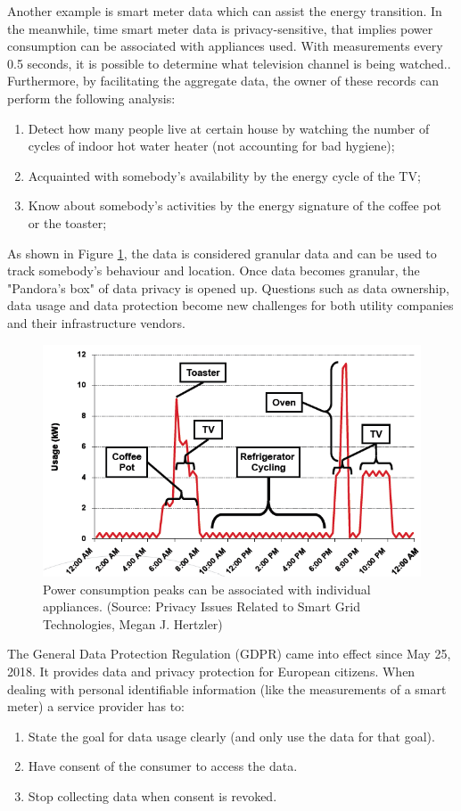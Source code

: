 \documentclass[journal,article,applsci,submit,moreauthors,pdftex]{Definitions/mdpi}
\begin{document}
Another example is smart meter data which can assist the energy transition. In the meanwhile, time smart meter data is privacy-sensitive, that implies power consumption can be associated with appliances used. With measurements every 0.5 seconds, it is possible to determine what television channel is being watched.\cite{SmartGridPrivacy}. Furthermore, by facilitating the aggregate data, the owner of these records can perform the following analysis:
\begin{enumerate}[leftmargin=*,labelsep=4.9mm]
    \item Detect how many people live at certain house by watching the number of cycles of indoor hot water heater (not accounting for bad hygiene);
    \item Acquainted with somebody's availability by the energy cycle of the TV;
    \item Know about somebody's activities by the energy signature of the coffee pot or the toaster;
\end{enumerate}

As shown in Figure \ref{fig:power_usage}, the data is considered granular data and can be used to track somebody's behaviour and location. Once data becomes granular, the "Pandora's box" of data privacy is opened up. Questions such as data ownership, data usage and data protection become new challenges for both utility companies and their infrastructure vendors.

\begin{figure}[h]
    \centering
    \includegraphics[width=4.5 in]{power_usage}
    \caption{Power consumption peaks can be associated with individual appliances. (Source: Privacy Issues Related to Smart Grid Technologies, Megan J. Hertzler)}
    \label{fig:power_usage}
\end{figure}

The General Data Protection Regulation (GDPR) came into effect since May 25, 2018. It provides data and privacy protection for European citizens. When dealing with personal identifiable information (like the measurements of a smart meter) a service provider has to:
\begin{enumerate}[leftmargin=*,labelsep=4.9mm]
    \item State the goal for data usage clearly (and only use the data for that goal).
    \item Have consent of the consumer to access the data.
    \item Stop collecting data when consent is revoked.
\end{enumerate}
\end{document}
